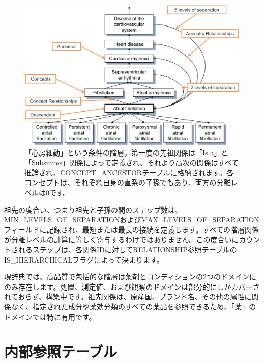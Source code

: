\documentclass[
  11pt]{book}
\theoremstyle{definition}
\theoremstyle{definition}
\theoremstyle{definition}
\theoremstyle{definition}
\theoremstyle{remark}
\begin{document}
\begin{figure}

{\centering \includegraphics[width=1\linewidth]{images/StandardizedVocabularies/conceptAncestor} 

}

\caption{「心房細動」という条件の階層。第一度の先祖関係は「Is a」と「Subsumes」関係によって定義され、それより高次の関係はすべて推論され、CONCEPT\_ANCESTORテーブルに格納されます。各コンセプトは、それぞれ自身の直系の子孫でもあり、両方の分離レベルは0です。 }\label{fig:conceptAncestor}
\end{figure}

祖先の度合い、つまり祖先と子孫の間のステップ数は、MIN\_LEVELS\_OF\_SEPARATIONおよびMAX\_LEVELS\_OF\_SEPARATIONフィールドに記録され、最短または最長の接続を定義します。すべての階層関係が分離レベルの計算に等しく寄与するわけではありません。この度合いにカウントされるステップは、各関係IDに対してRELATIONSHIP参照テーブルのIS\_HIERARCHICALフラグによって決まります。

現辞典では、高品質で包括的な階層は薬剤とコンディションの2つのドメインにのみ存在します。処置、測定値、および観察のドメインは部分的にしかカバーされておらず、構築中です。祖先関係は、原産国、ブランド名、その他の属性に関係なく、指定された成分や薬効分類のすべての薬品を参照できるため、「薬」のドメインでは特に有用です。

\section{内部参照テーブル}\label{ux5185ux90e8ux53c2ux7167ux30c6ux30fcux30d6ux30eb}
\end{document}
